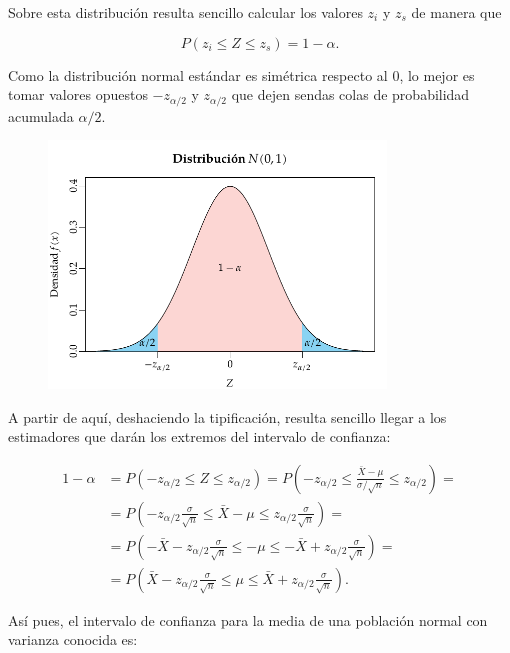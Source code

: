 \documentclass[
  a4paper,
]{scrreport}
\theoremstyle{definition}
\theoremstyle{definition}
\theoremstyle{plain}
\theoremstyle{remark}
\begin{document}
Sobre esta distribución resulta sencillo calcular los valores \(z_i\) y
\(z_s\) de manera que

\[
P(z_i\leq Z \leq z_s) = 1-\alpha.
\]

Como la distribución normal estándar es simétrica respecto al 0, lo
mejor es tomar valores opuestos \(-z_{\alpha/2}\) y \(z_{\alpha/2}\) que
dejen sendas colas de probabilidad acumulada \(\alpha/2\).

\begin{figure}

{\centering \includegraphics[width=0.8\textwidth,height=\textheight]{img/estimacion/extremos-intervalo-media-normal.pdf}

}

\end{figure}

A partir de aquí, deshaciendo la tipificación, resulta sencillo llegar a
los estimadores que darán los extremos del intervalo de confianza:

\begin{align*}
1-\alpha &= P(-z_{\alpha/2}\leq Z \leq z_{\alpha/2}) = P\left(-z_{\alpha/2}\leq \frac{\bar X -\mu}{\sigma/\sqrt{n}} \leq z_{\alpha/2}\right) =\\
&= P\left(-z_{\alpha/2}\frac{\sigma}{\sqrt{n}}\leq \bar X -\mu \leq z_{\alpha/2}\frac{\sigma}{\sqrt{n}}\right)=\\
&= P\left(-\bar{X}-z_{\alpha/2}\frac{\sigma}{\sqrt{n}}\leq -\mu \leq -\bar{X}+z_{\alpha/2}\frac{\sigma}{\sqrt{n}}\right)= \\
&= P\left(\bar{X}-z_{\alpha/2}\frac{\sigma}{\sqrt{n}}\leq \mu \leq \bar{X}+z_{\alpha/2}\frac{\sigma}{\sqrt{n}}\right).
\end{align*}

Así pues, el intervalo de confianza para la media de una población
normal con varianza conocida es:
\end{document}
